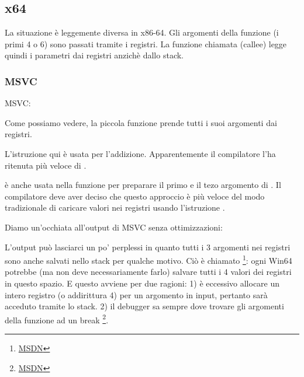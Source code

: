 \subsection{x64}


La situazione è leggemente diversa in x86-64. Gli argomenti della funzione (i primi 4 o 6) 
sono passati tramite i registri. La funzione chiamata (\gls{callee}) legge quindi i parametri dai registri anzichè dallo stack.

\subsubsection{MSVC}

\Optimizing MSVC:



Come possiamo vedere, la piccola funzione \ttf prende tutti i suoi argomenti dai registri.

L'istruzione \LEA qui è usata per l'addizione. Apparentemente il compilatore l'ha ritenuta più veloce di .

\LEA è anche usata nella funzione \main per preparare il primo e il tezo argomento di \ttf.
Il compilatore deve aver deciso che questo approccio è più veloce del modo tradizionale di caricare valori nei registri usando l'istruzione \MOV.

Diamo un'occhiata all'output di MSVC senza ottimizzazioni:



L'output può lasciarci un po' perplessi in quanto tutti i 3 argomenti nei registri sono anche salvati nello stack per qualche motivo. 
\label{shadow_space}
Ciò è chiamato 
\footnote{\href{http://msdn.microsoft.com/en-us/library/zthk2dkh(v=vs.80).aspx}{MSDN}}: 
ogni Win64 potrebbe (ma non deve necessariamente farlo) salvare tutti i 4 valori dei registri in questo spazio.
E questo avviene per due ragioni: 
1) è eccessivo allocare un intero registro (o addirittura 4) per un argomento in input, pertanto sarà acceduto tramite lo stack.
2) il debugger sa sempre dove trovare gli argomenti della funzione ad un break
\footnote{\href{http://msdn.microsoft.com/en-us/library/ew5tede7(v=VS.90).aspx}{MSDN}}.

